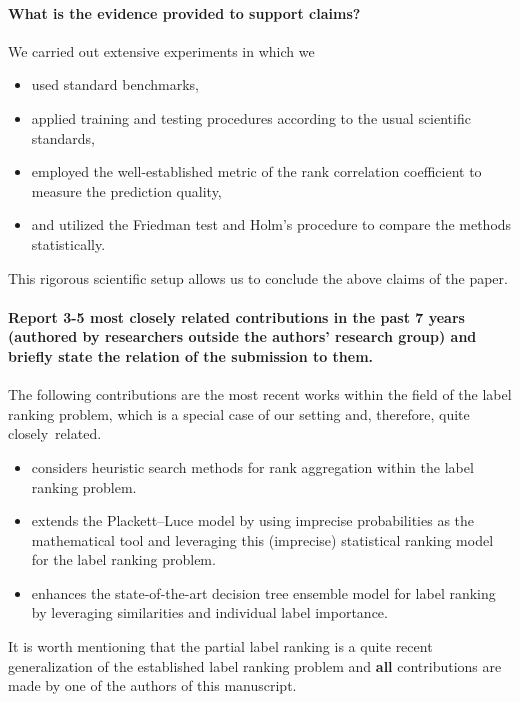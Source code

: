 \documentclass[pdflatex, sn-apa]{sn-jnl}
\begin{document}
\paragraph{What is the evidence provided to support claims?}
%
%
We carried out extensive experiments in which we
%
\begin{itemize}
%
    \item used standard benchmarks,
    \item applied training and testing procedures according to the usual scientific standards,
    \item employed the well-established metric of the rank correlation coefficient to measure the prediction quality, 
    \item and utilized the Friedman test and Holm's procedure to compare the methods statistically.
%
\end{itemize}
%
This rigorous scientific setup allows us to conclude the above claims of the paper.
%
%

\paragraph{Report 3-5 most closely related contributions in the past 7 years (authored by researchers outside the authors’ research group) and briefly state the relation of the submission to them.}
%
The following contributions are the most recent works within the field of the label ranking problem, which is a special case of our setting and, therefore, quite closely~related.
%
\begin{itemize}
    \item \textcite{zhou_heuristic_2024} considers heuristic search methods for rank aggregation within the label ranking problem.
    \item \textcite{adam_inferring_2024} extends the Plackett–Luce model by using imprecise probabilities as the mathematical tool and leveraging this (imprecise) statistical ranking model for the label ranking problem. 
    \item \textcite{albano_weighted_2023} enhances the state-of-the-art decision tree ensemble model for label ranking by leveraging similarities and individual label importance. 
\end{itemize}
%
It is worth mentioning that the partial label ranking is a quite recent generalization of the established label ranking problem and \textbf{all} contributions are made by one of the authors of this manuscript.
%
%
\end{document}
